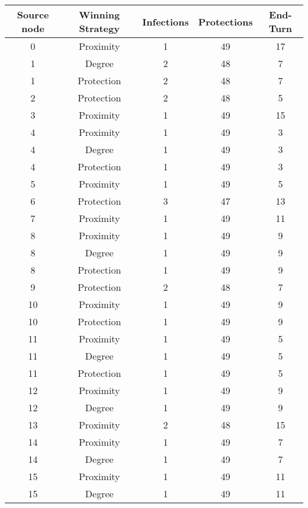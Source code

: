 \documentclass[results.tex]{subfiles}
\begin{document}
\begin{center}
  \begin{tabular}{| c || c | c | c | c |}
    \hline
    {\bfseries Source node} & {\bfseries Winning Strategy} & {\bfseries Infections} & {\bfseries Protections} & {\bfseries End-Turn} \\  %
    \hline\hline
    0 & Proximity & 1 & 49 & 17 \\ 
    \hline
    1 & Degree & 2 & 48 & 7 \\ 
    \hline
    1 & Protection & 2 & 48 & 7 \\ 
    \hline
    2 & Protection & 2 & 48 & 5 \\ 
    \hline
    3 & Proximity & 1 & 49 & 15 \\ 
    \hline
    4 & Proximity & 1 & 49 & 3 \\ 
    \hline
    4 & Degree & 1 & 49 & 3 \\ 
    \hline
    4 & Protection & 1 & 49 & 3 \\ 
    \hline
    5 & Proximity & 1 & 49 & 5 \\ 
    \hline
    6 & Protection & 3 & 47 & 13 \\ 
    \hline
    7 & Proximity & 1 & 49 & 11 \\ 
    \hline
    8 & Proximity & 1 & 49 & 9 \\ 
    \hline
    8 & Degree & 1 & 49 & 9 \\ 
    \hline
    8 & Protection & 1 & 49 & 9 \\ 
    \hline
    9 & Protection & 2 & 48 & 7 \\ 
    \hline
    10 & Proximity & 1 & 49 & 9 \\ 
    \hline
    10 & Protection & 1 & 49 & 9 \\ 
    \hline
    11 & Proximity & 1 & 49 & 5 \\ 
    \hline
    11 & Degree & 1 & 49 & 5 \\ 
    \hline
    11 & Protection & 1 & 49 & 5 \\ 
    \hline
    12 & Proximity & 1 & 49 & 9 \\ 
    \hline
    12 & Degree & 1 & 49 & 9 \\ 
    \hline
    13 & Proximity & 2 & 48 & 15 \\ 
    \hline
    14 & Proximity & 1 & 49 & 7 \\ 
    \hline
    14 & Degree & 1 & 49 & 7 \\ 
    \hline
    15 & Proximity & 1 & 49 & 11 \\ 
    \hline
    15 & Degree & 1 & 49 & 11 \\ 

\end{tabular}
\end{center}
\end{document}
